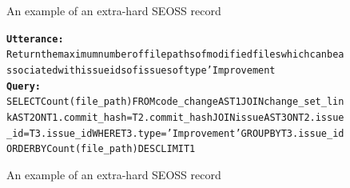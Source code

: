 
\begin{figure}[H]
    \label{fig:SESS2}
    \begin{AIbox}{An example of an extra-hard SEOSS record}
        \vspace{-5px}
        \parbox{1\textwidth}{\scriptsize
        \begin{alltt} \larger
            {\bf Utterance:} \\ 
            Return  the maximum number of file paths of modified files which can be associated with issue ids of issues of type 'Improvement
            \\
            {\bf Query:} \\
            SELECT Count(file\_path) FROM code\_change AS T1 JOIN change\_set\_link AS T2 ON T1.commit\_hash = T2.commit\_hash JOIN issue AS T3 ON T2.issue\_id = T3.issue\_id WHERE T3.type = 'Improvement' GROUP BY T3.issue\_id ORDER BY Count(file\_path) DESC LIMIT 1
        \end{alltt}
        }
        \vspace{-5px}
    \end{AIbox}
    
    \caption{An example of an extra-hard SEOSS record}
\end{figure}

